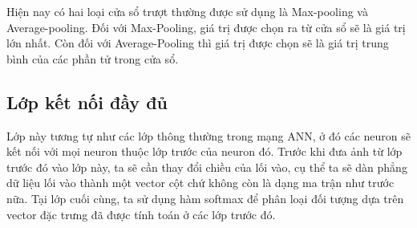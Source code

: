 Hiện nay có hai loại cửa sổ trượt thường được sử dụng là Max-pooling và Average-pooling. Đối với Max-Pooling, giá trị được chọn ra từ cửa sổ sẽ là giá trị lớn nhất. Còn đối với Average-Pooling thì giá trị được chọn sẽ là giá trị trung bình của các phần tử trong cửa sổ. 

\subsection{Lớp kết nối đầy đủ}
Lớp này tương tự như các lớp thông thường trong mạng ANN, ở đó các neuron sẽ kết nối với mọi neuron thuộc lớp trước của neuron đó. Trước khi đưa ảnh từ lớp trước đó vào lớp này, ta sẽ cần thay đổi chiều của lối vào, cụ thể ta sẽ dàn phẳng dữ liệu lối vào thành một vector cột chứ không còn là dạng ma trận như trước nữa. Tại lớp cuối cùng, ta sử dụng hàm softmax để phân loại đối tượng dựa trên vector đặc trưng đã được tính toán ở các lớp trước đó. 
